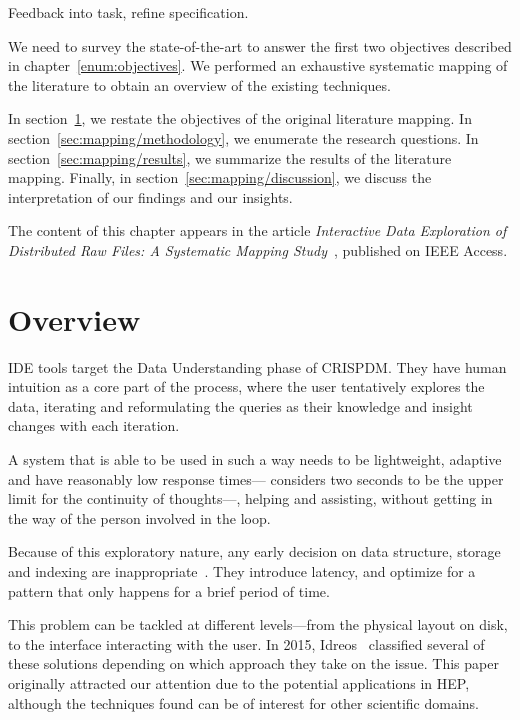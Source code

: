 
Feedback into task, refine specification.


We need to survey the state-of-the-art to answer the first two objectives described in
chapter~\ref{enum:objectives}.
We performed an exhaustive systematic mapping of the literature to obtain an overview
of the existing techniques.

In section~\ref{sec:mapping/overview}, we restate the objectives of the original
literature mapping.
In section~\ref{sec:mapping/methodology}, we enumerate the research questions.
In section~\ref{sec:mapping/results}, we summarize the results of the literature mapping.
Finally, in section~\ref{sec:mapping/discussion}, we discuss the interpretation of our findings and our insights.

The content of this chapter appears in the article
\emph{Interactive Data Exploration of Distributed Raw Files: A Systematic Mapping
Study}~\cite{Alvarez2019}, published on IEEE Access.

\section{Overview}
\label{sec:mapping/overview}
\gls{IDE} tools target the Data Understanding phase of \gls{CRISPDM}. They have
human intuition as a core part of the process, where the user tentatively
explores the data, iterating and reformulating the queries as
their knowledge and insight changes with each iteration.

A system that is able to be used in such a way needs to be lightweight, adaptive
and have reasonably low response times---\cite{Miller1968} considers two seconds
to be the upper limit for the continuity of thoughts---,
helping and assisting, without getting in the way of the person involved in
the loop.

Because of this exploratory nature, any early decision on data structure,
storage and indexing are inappropriate~\cite{Kersten2011}. They introduce latency,
and optimize for a pattern that only happens for a brief period of time.

This problem can be tackled at different levels---from the physical layout on disk,
to the interface interacting with the user. In 2015, Idreos~\cite{Idreos2015}
classified several of these solutions depending on which approach they take
on the issue. This paper originally attracted our attention  due to the potential
applications in \gls{HEP}\footnotemark, although
the techniques found can be of interest for other scientific domains.

